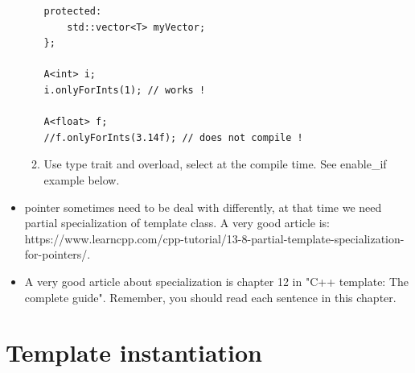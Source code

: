\documentclass[a4paper,11pt,twoside]{book}
\begin{document}
\begin{itemize}
\begin{enumerate}
\begin{lstlisting}[numbers=none]
protected:
	std::vector<T> myVector;
};

A<int> i;
i.onlyForInts(1); // works !

A<float> f;
//f.onlyForInts(3.14f); // does not compile !
\end{lstlisting}

\item Use type trait and overload, select at the compile time. See enable\_if example below.

\end{enumerate}

    \item pointer sometimes need to be deal with differently, at that time we need partial specialization of template class. A very good article is:\\ https://www.learncpp.com/cpp-tutorial/13-8-partial-template-specialization-for-pointers/. 

    \item A very good article about specialization is chapter 12 in "C++ template: The complete guide". Remember, you should read each sentence in this chapter.
\end{itemize}


\section{Template instantiation}
\end{document}
